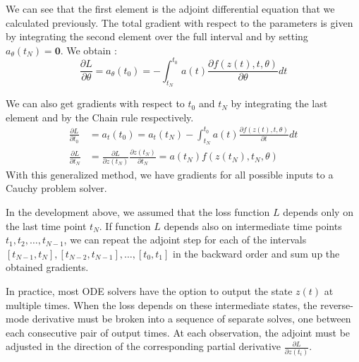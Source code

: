 \documentclass[10pt,a4paper]{article}
\theoremstyle{definition}
\theoremstyle{definition}
\begin{document}
We can see that the first element is the adjoint differential equation that we calculated previously. The total gradient with respect to the parameters is given by integrating the second element over the full interval and by setting $a_\theta (t_N) = \textbf{0}$. We obtain :
$$
\frac{\partial L}{\partial \theta} = a_\theta (t_0) = - \int_{t_N}^{t_0} a(t) \frac{\partial f(z(t),t,\theta)}{\partial \theta} dt
$$

We can also get gradients with respect to $t_0$ and $t_N$ by integrating the last element and by the Chain rule respectively.
\begin{align*}
\frac{\partial L}{\partial t_0} &= a_t(t_0) = a_t(t_N) - \int_{t_N}^{t_0} a(t) \frac{\partial f(z(t),t,\theta)}{\partial t} dt \\
\frac{\partial L}{\partial t_N} &= \frac{\partial L}{\partial z(t_N)} \frac{\partial z(t_N)}{\partial t_N} = a(t_N)f(z(t_N),t_N,\theta)
\end{align*}
With this generalized method, we have gradients for all possible inputs to a Cauchy problem solver.



In the development above, we assumed that the loss function $L$ depends only on the last time point $t_N$. If function $L$ depends also on intermediate time points $t_1, t_2, \dots , t_{N-1}$, we can repeat the adjoint step for each of the intervals $[t_{N-1}, t_N ],[t_{N-2}, t_{N-1}], \dots , [t_0,t_1]$ in the backward order and sum up the obtained gradients.

In practice, most ODE solvers have the option to output the state $z(t)$ at multiple times. When the loss depends on these intermediate states, the reverse-mode derivative must be broken into a sequence of separate solves, one between each consecutive pair of output times. At each observation, the adjoint must be adjusted in the direction of the corresponding partial derivative $\frac{\partial L}{\partial z(t_i)}$.
\end{document}
